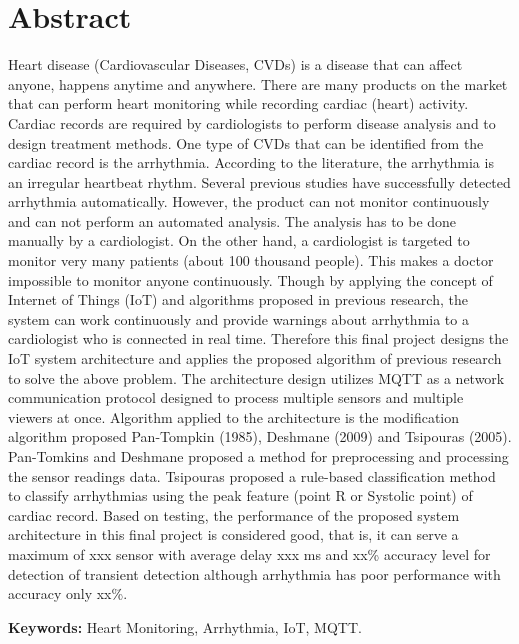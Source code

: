 \chapter*{Abstract}

Heart disease (Cardiovascular Diseases, CVDs) is a disease that can affect anyone, happens anytime and anywhere. There are many products on the market that can perform heart monitoring while recording cardiac (heart) activity. Cardiac records are required by cardiologists to perform disease analysis and to design treatment methods. One type of CVDs that can be identified from the cardiac record is the arrhythmia. According to the literature, the arrhythmia is an irregular heartbeat rhythm. Several previous studies have successfully detected arrhythmia automatically. However, the product can not monitor continuously and can not perform an automated analysis. The analysis has to be done manually by a cardiologist. On the other hand, a cardiologist is targeted to monitor very many patients (about 100 thousand people). This makes a doctor impossible to monitor anyone continuously. Though by applying the concept of Internet of Things (IoT) and algorithms proposed in previous research, the system can work continuously and provide warnings about arrhythmia to a cardiologist who is connected in real time. Therefore this final project designs the IoT system architecture and applies the proposed algorithm of previous research to solve the above problem. The architecture design utilizes MQTT as a network communication protocol designed to process multiple sensors and multiple viewers at once. Algorithm applied to the architecture is the modification algorithm proposed Pan-Tompkin (1985), Deshmane (2009) and Tsipouras (2005). Pan-Tomkins and Deshmane proposed a method for preprocessing and processing the sensor readings data. Tsipouras proposed a rule-based classification method to classify arrhythmias using the peak feature (point R or Systolic point) of cardiac record. Based on testing, the performance of the proposed system architecture in this final project is considered good, that is, it can serve a maximum of xxx sensor with average delay xxx ms and xx\% accuracy level for detection of transient detection although arrhythmia has poor performance with accuracy only xx\%.

\vspace{0.5 cm}
\begin{flushleft}
{\textbf{Keywords:} Heart Monitoring, Arrhythmia, IoT, MQTT.}
\end{flushleft}